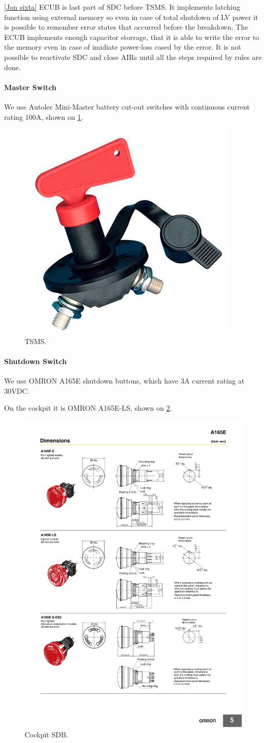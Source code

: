 \ref{Jan sixta}
ECUB is last part of SDC before TSMS. It implements latching function using external memory so even in case of total shutdown of LV power it is possible to remember error states that occurred before the breakdown. The ECUB implements enough capacitor storrage, that it is able to write the error to the memory even in case of imidiate power-loss cased by the error. It is not possible to reactivate SDC and close AIRs until all the steps required by rules are done.

\paragraph{Master Switch}
We use Autolec Mini-Master battery cut-out switches with continuous current rating 100A, shown on \ref{fig:SDC-TSMS}.
\begin{figure}[H]
	\centering
	\includegraphics[width=.5\textwidth]{./img/SDC-TSMS.jpg}
	\caption{TSMS.}
	\label{fig:SDC-TSMS}
\end{figure}

\paragraph{Shutdown Switch}
We use OMRON A165E shutdown buttons, which have 3A current rating at 30VDC.

On the cockpit it is OMRON A165E-LS, shown on \ref{fig:SDC-A165E-LS}.
\begin{figure}[H]
	\centering
	\includegraphics[width=.5\textwidth]{./img/SDC-A165E-LS.pdf}
	\caption{Cockpit SDB.}
	\label{fig:SDC-A165E-LS}
\end{figure}


